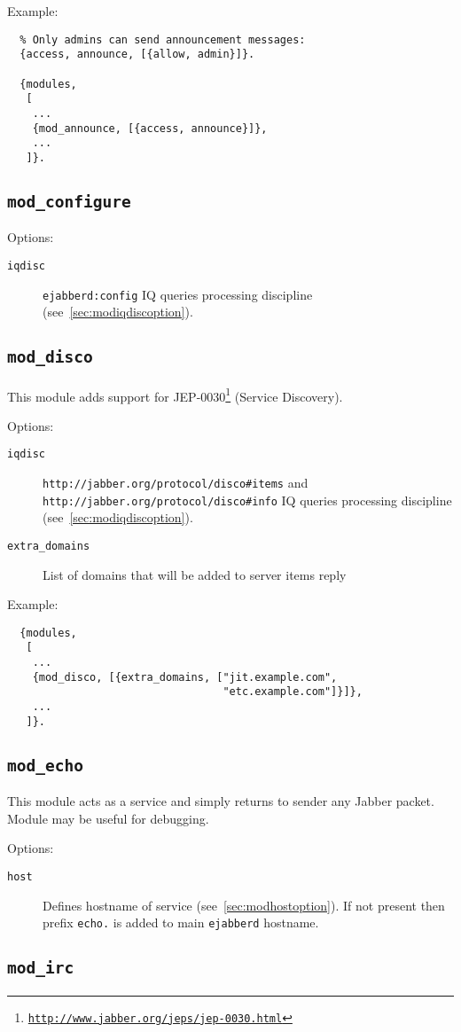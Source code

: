 \documentclass[a4paper,10pt]{article}
\newcommand{\bracehack}{\def\{{\char"7B}\def\}{\char"7D}}
\newcommand{\ns}[1]{\texttt{#1}}
\newcommand{\jid}[1]{\texttt{#1}}
\newcommand{\ejabberd}{\texttt{ejabberd}}
\newcommand{\Jabber}{Jabber}
\newcommand{\module}[1]{\texttt{#1}}
\newcommand{\modconfigure}{\module{mod\_configure}}
\newcommand{\moddisco}{\module{mod\_disco}}
\newcommand{\modirc}{\module{mod\_irc}}
\newcommand{\modecho}{\module{mod\_echo}}
\newcommand{\titem}[1]{\item[\bracehack\texttt{#1}]}
\gdef\footahref#1#2{#2\footnote{\href{#1}{\texttt{#1}}}}
\newcommand{\tjepref}[2]{\footahref{http://www.jabber.org/jeps/jep-#1.html}{#2}}
\newcommand{\jepref}[1]{\tjepref{#1}{JEP-#1}}
\newcommand{\iqdiscitem}[1]{\titem{iqdisc} #1 IQ queries processing
discipline (see~\ref{sec:modiqdiscoption}).}
\newcommand{\hostitem}[1]{\titem{host} Defines hostname of service
(see~\ref{sec:modhostoption}). If not present
then prefix \jid{#1.} is added to main \ejabberd{} hostname.}
\begin{document}
Example:
\begin{verbatim}
  % Only admins can send announcement messages:
  {access, announce, [{allow, admin}]}.

  {modules,
   [
    ...
    {mod_announce, [{access, announce}]},
    ...
   ]}.
\end{verbatim}


\subsection{\modconfigure{}}
\label{sec:modconfigure}

Options:
\begin{description}
\iqdiscitem{\ns{ejabberd:config}}
\end{description}


\subsection{\moddisco{}}
\label{sec:moddisco}

This module adds support for \jepref{0030} (Service Discovery).

Options:
\begin{description}
\iqdiscitem{\ns{http://jabber.org/protocol/disco\#items} and
  \ns{http://jabber.org/protocol/disco\#info}}
\titem{extra\_domains} List of domains that will be added to server
  items reply
\end{description}

Example:
\begin{verbatim}
  {modules,
   [
    ...
    {mod_disco, [{extra_domains, ["jit.example.com",
                                  "etc.example.com"]}]},
    ...
   ]}.
\end{verbatim}


\subsection{\modecho{}}
\label{sec:modecho}

This module acts as a service and simply returns to sender any \Jabber{} packet. Module may be
useful for debugging.

Options:
\begin{description}
\hostitem{echo}
\end{description}


\subsection{\modirc{}}
\label{sec:modirc}
\end{document}
